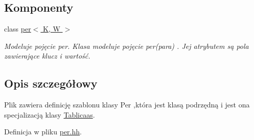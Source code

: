 \subsection*{Komponenty}
\begin{DoxyCompactItemize}
\item 
class \hyperlink{classper}{per$<$ K, W $>$}
\begin{DoxyCompactList}\small\item\em Modeluje pojęcie per. Klasa modeluje pojęcie per(para) . Jej atrybutem są pola zawierające klucz i wartość. \end{DoxyCompactList}\end{DoxyCompactItemize}


\subsection{Opis szczegółowy}
Plik zawiera definicję szablonu klasy Per ,która jest klasą podrzędną i jest ona specjalizacją klasy \hyperlink{class_tablicaas}{Tablicaas}. 

Definicja w pliku \hyperlink{per_8hh_source}{per.\-hh}.

